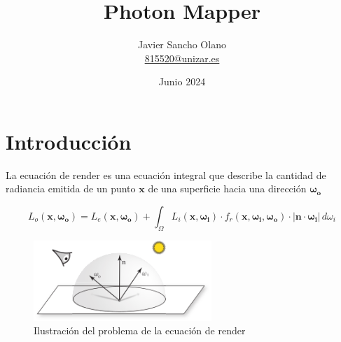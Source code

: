 \documentclass{article}
\title{Photon Mapper}
\author{Javier Sancho Olano \\ \href{mailto:815520@unizar.es}{815520@unizar.es}}
\date{Junio 2024}
\begin{document}
\maketitle

\section{Introducción}
La ecuación de render es una ecuación integral que describe la cantidad de
radiancia emitida de un punto \(\mathbf{x}\) de una superficie hacia una
dirección \(\mathbf{\omega_{o}}\)

\begin{equation}
L_o(\mathbf{x}, \mathbf{\omega_{o}}) = L_e(\mathbf{x}, \mathbf{\omega_{o}}) + \int_{\Omega} L_i(\mathbf{x}, \mathbf{\omega_{i}}) \cdot f_r(\mathbf{x}, \mathbf{\omega_{i}}, \mathbf{\omega_{o}}) \cdot  |\mathbf{n} \cdot \mathbf{\omega_{i}}| \, d\omega_{i}
\end{equation}

\begin{figure}[h]
    \centering
    \includegraphics[width=0.6\textwidth]{imgs/rendereq.png}
    \caption{Ilustración del problema de la ecuación de render}
\end{figure}
\end{document}
